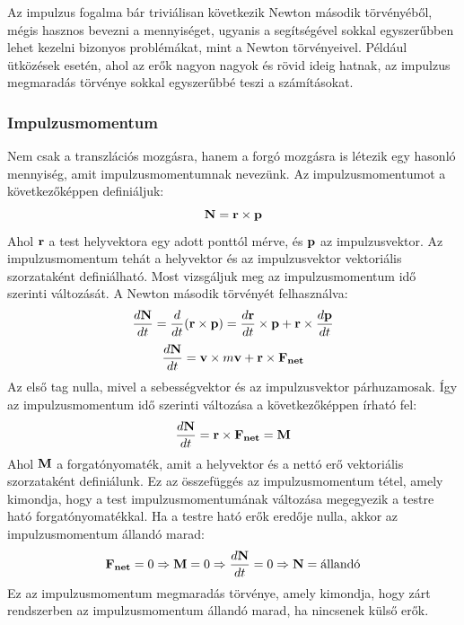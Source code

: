 \documentclass[../main.tex]{subfiles}
\begin{document}
Az impulzus fogalma bár triviálisan következik Newton második törvényéből, mégis hasznos bevezni a mennyiséget, ugyanis a segítségével sokkal egyszerűbben lehet kezelni bizonyos problémákat, mint a Newton törvényeivel.
Például ütközések esetén, ahol az erők nagyon nagyok és rövid ideig hatnak, az impulzus megmaradás törvénye sokkal egyszerűbbé teszi a számításokat.

\subsubsection{Impulzusmomentum}
Nem csak a transzlációs mozgásra, hanem a forgó mozgásra is létezik egy hasonló mennyiség, amit impulzusmomentumnak nevezünk. Az impulzusmomentumot a következőképpen definiáljuk:
\begin{equation}
    \bold{N} = \bold{r} \times \bold{p}
\end{equation}
Ahol $\bold{r}$ a test helyvektora egy adott ponttól mérve, és $\bold{p}$ az impulzusvektor. Az impulzusmomentum tehát a helyvektor és az impulzusvektor vektoriális szorzataként definiálható.
Most vizsgáljuk meg az impulzusmomentum idő szerinti változását. A Newton második törvényét felhasználva:
\begin{equation}
    \frac{d\bold{N}}{dt} = \frac{d}{dt}(\bold{r} \times \bold{p}) = \frac{d\bold{r}}{dt} \times \bold{p} + \bold{r} \times \frac{d\bold{p}}{dt}
\end{equation}
\begin{equation}
    \frac{d\bold{N}}{dt} = \bold{v} \times m\bold{v} + \bold{r} \times \bold{F_{net}}
\end{equation}
Az első tag nulla, mivel a sebességvektor és az impulzusvektor párhuzamosak. Így az impulzusmomentum idő szerinti változása a következőképpen írható fel:
\begin{equation}
    \frac{d\bold{N}}{dt} = \bold{r} \times \bold{F_{net}} = \bold{M}
\end{equation}
Ahol $\bold{M}$ a forgatónyomaték, amit a helyvektor és a nettó erő vektoriális szorzataként definiálunk. Ez az összefüggés az impulzusmomentum tétel, amely kimondja, hogy a test impulzusmomentumának változása megegyezik a testre ható forgatónyomatékkal.
Ha a testre ható erők eredője nulla, akkor az impulzusmomentum állandó marad:
\begin{equation}
    \bold{F_{net}} = 0 \Rightarrow \bold{M} = 0 \Rightarrow \frac{d\bold{N}}{dt} = 0 \Rightarrow \bold{N} = \text{állandó}
\end{equation}
Ez az impulzusmomentum megmaradás törvénye, amely kimondja, hogy zárt rendszerben az impulzusmomentum állandó marad, ha nincsenek külső erők.
\end{document}
